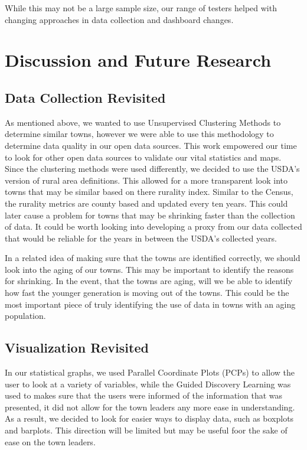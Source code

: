 \documentclass[letterpaper,inpress]{jdsart}
\begin{document}
While this may not be a large sample size, our range of testers helped with changing approaches in data collection and dashboard changes.

\section{Discussion and Future Research}

\subsection{Data Collection Revisited}

As mentioned above, we wanted to use Unsupervised Clustering Methods to determine similar towns, however we were able to use this methodology to determine data quality in our open data sources. This work empowered our time to look for other open data sources to validate our vital statistics and maps. Since the clustering methods were used differently, we decided to use the USDA's version of rural area definitions. This allowed for a more transparent look into towns that may be similar based on there rurality index. Similar to the Census, the rurality metrics are county based and updated every ten years. This could later cause a problem for towns that may be shrinking faster than the collection of data. It could be worth looking into developing a proxy from our data collected that would be reliable for the years in between the USDA's collected years.

In a related idea of making sure that the towns are identified correctly, we should look into the aging of our towns. This may be important to identify the reasons for shrinking. In the event, that the towns are aging, will we be able to identify how fast the younger generation is moving out of the towns. This could be the most important piece of truly identifying the use of data in towns with an aging population.

\subsection{Visualization Revisited}

In our statistical graphs, we used Parallel Coordinate Plots (PCPs) to allow the user to look at a variety of variables, while the Guided Discovery Learning was used to makes sure that the users were informed of the information that was presented, it did not allow for the town leaders any more ease in understanding. As a result, we decided to look for easier ways to display data, such as boxplots and barplots. This direction will be limited but may be useful foor the sake of ease on the town leaders.
\end{document}
